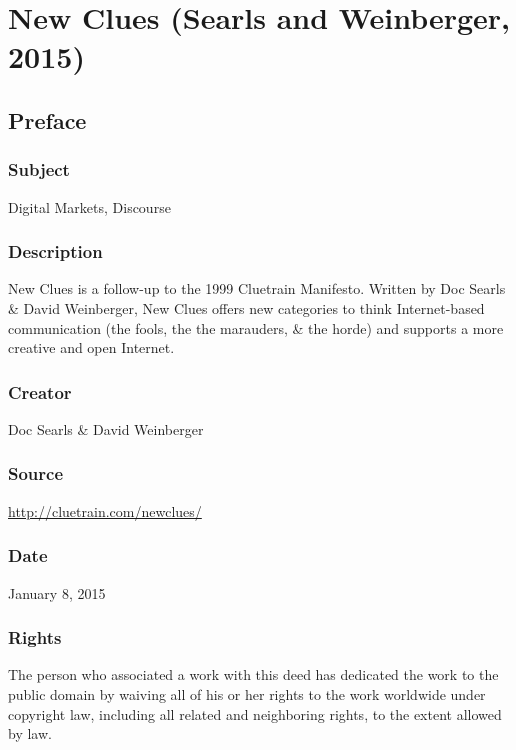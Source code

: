 \documentclass[letterpaper,12pt,english]{sphinxmanual}
\begin{document}
\chapter{New Clues (Searls and Weinberger, 2015)}
\label{2015newclues:new-clues-searls-and-weinberger-2015}\label{2015newclues::doc}

\section{Preface}
\label{2015newclues:preface}

\subsection{Subject}
\label{2015newclues:subject}
Digital Markets, Discourse


\subsection{Description}
\label{2015newclues:description}
New Clues is a follow-up to the 1999 Cluetrain Manifesto. Written by Doc Searls \& David Weinberger, New Clues offers new categories to think Internet-based communication (the fools, the the marauders, \& the horde) and supports a more creative and open Internet.


\subsection{Creator}
\label{2015newclues:creator}
Doc Searls \& David Weinberger


\subsection{Source}
\label{2015newclues:source}
\url{http://cluetrain.com/newclues/}


\subsection{Date}
\label{2015newclues:date}
January 8, 2015


\subsection{Rights}
\label{2015newclues:rights}
The person who associated a work with this deed has dedicated the work to the public domain by waiving all of his or her rights to the work worldwide under copyright law, including all related and neighboring rights, to the extent allowed by law.
\end{document}

